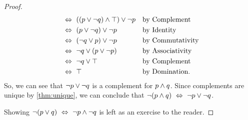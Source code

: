 \begin{proof}
\begin{alignat*}{2}
                                                &\iff \pn*{(p \join \neg q) \meet \top} \join \neg p &&\text{by Complement}\\
                                                &\iff (p \join \neg q) \join \neg p &&\text{by Identity}\\
                                                &\iff (\neg q \join p) \join \neg p &&\text{by Commutativity}\\
                                                &\iff \neg q \join (p \join \neg p) &&\text{by Associativity}\\
                                                &\iff \neg q \join \top &&\text{by Complement}\\
                                                &\iff \top &&\text{by Domination}.
    \end{alignat*}
    So, we can see that $\neg p \vee \neg q$ is a complement for $p \wedge q$.
    Since complements are unique by \autoref{thm:unique},
    we can conclude that $\neg (p \wedge q) ~\Leftrightarrow~ \neg p \vee \neg q$.

    Showing $\neg (p \vee q) ~\Leftrightarrow~ \neg p \wedge \neg q$ is left as an exercise to the reader.
\end{proof}


